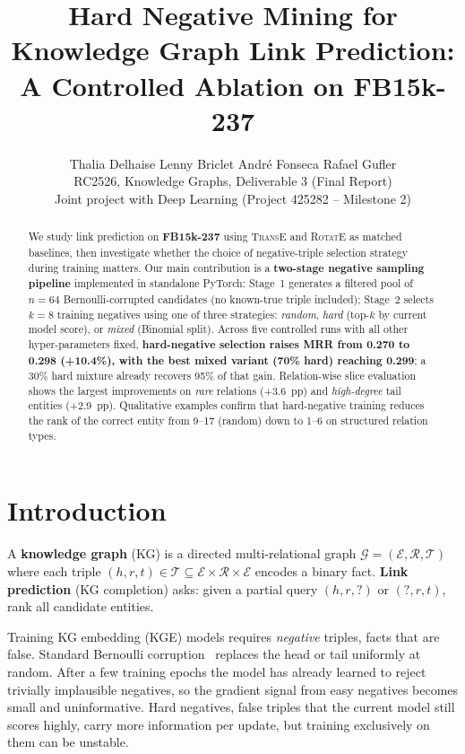 \documentclass[10pt,twocolumn,letterpaper]{article}
\title{Hard Negative Mining for Knowledge Graph Link Prediction:\\
A Controlled Ablation on FB15k-237}
\author{
  Thalia Delhaise \quad Lenny Briclet \quad Andr\'e Fonseca \quad Rafael Gufler \\
  RC2526, Knowledge Graphs, Deliverable 3 (Final Report) \\
  Joint project with Deep Learning (Project 425282 -- Milestone 2)
}
\begin{document}
\maketitle

\begin{abstract}
We study link prediction on \textbf{FB15k-237} using \textsc{TransE} and
\textsc{RotatE} as matched baselines, then investigate whether the choice of
negative-triple selection strategy during training matters. Our main contribution
is a \textbf{two-stage negative sampling pipeline} implemented in standalone
PyTorch: Stage~1 generates a filtered pool of $n\!=\!64$ Bernoulli-corrupted
candidates (no known-true triple included); Stage~2 selects $k\!=\!8$ training
negatives using one of three strategies: \emph{random}, \emph{hard}
(top-$k$ by current model score), or \emph{mixed} (Binomial split).
Across five controlled runs with all other hyper-parameters fixed,
\textbf{hard-negative selection raises MRR from 0.270 to 0.298 (+10.4\%),
with the best mixed variant (70\% hard) reaching 0.299};
a 30\% hard mixture already recovers 95\% of that gain.
Relation-wise slice evaluation shows the largest improvements on
\emph{rare} relations (+3.6~pp) and \emph{high-degree} tail entities (+2.9~pp).
Qualitative examples confirm that hard-negative training reduces the rank of
the correct entity from 9--17 (random) down to 1--6 on structured relation types.
\end{abstract}

\section{Introduction}
\label{sec:intro}

A \textbf{knowledge graph} (KG) is a directed multi-relational graph
$\mathcal{G}=(\mathcal{E},\mathcal{R},\mathcal{T})$ where each triple
$(h,r,t)\in\mathcal{T}\subseteq\mathcal{E}\times\mathcal{R}\times\mathcal{E}$
encodes a binary fact. \textbf{Link prediction} (KG completion) asks: given a
partial query $(h,r,?)$ or $(?,r,t)$, rank all candidate entities.

Training KG embedding (KGE) models requires \emph{negative} triples, facts
that are false. Standard Bernoulli corruption~\cite{wang2014knowledge} replaces
the head or tail uniformly at random. After a few training epochs the model has
already learned to reject trivially implausible negatives, so the gradient signal
from easy negatives becomes small and uninformative. Hard negatives, false
triples that the current model still scores highly, carry more information per
update, but training exclusively on them can be unstable.
\end{document}
